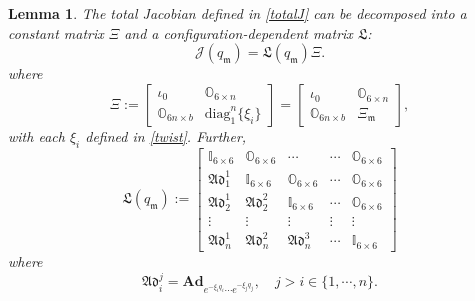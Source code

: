 \documentclass[lettersize,journal]{IEEEtran}
\def \Ad {\textbf{Ad}}
\def \Add {\mathfrak{Ad}}
\def \diag {\text{diag}}
\newtheorem{lemma}{Lemma}
\theoremstyle{remark}
\begin{document}
\begin{lemma}
The total Jacobian defined in \eqref{totalJ} can be decomposed into a constant matrix $\Xi$ and a configuration-dependent matrix $\mathfrak{L}$:
\begin{equation}
    \mathcal{J}(q_\mathfrak{m})=\mathfrak{L}(q_\mathfrak{m})\Xi.
\end{equation}
where 
\begin{equation}
\Xi:=\begin{bmatrix}\iota_0 &\mathbb{O}_{6\times n}\\\mathbb{O}_{6n\times b}& \diag_1^n\{\xi_i\}\end{bmatrix}=\begin{bmatrix}\iota_0&\mathbb{O}_{6\times n}\\\mathbb{O}_{6n\times b}&\Xi_\mathfrak{m}\end{bmatrix},
\end{equation}
with each $\xi_i$ defined in \eqref{twist}. Further, 
\begin{equation}
\mathfrak{L}(q_\mathfrak{m}):=\begin{bmatrix}\mathbb{I}_{6\times6}& \mathbb{O}_{6\times 6} & \cdots&\cdots&\mathbb{O}_{6\times 6}\\ \Add_1^1&\mathbb{I}_{6\times6}&\mathbb{O}_{6\times 6}&\cdots&\mathbb{O}_{6\times 6}\\ \Add^1_2 & \Add^2_2 &\mathbb{I}_{6\times6}&\cdots&\mathbb{O}_{6\times6}\\ \vdots &\vdots & \vdots &\vdots & \vdots\\ \Add^1_n& \Add^2_n &\Add^3_n&\cdots&\mathbb{I}_{6\times6}\end{bmatrix}
\label{LofJ}
\end{equation}
where
\begin{equation}
    \Add^j_i=\Ad_{e^{-\xi_{i}q_{i}}\cdots e^{-\xi_jq_j}}, \quad j>i \in \{1, \cdots , n\}.
\end{equation}
\end{lemma}
\end{document}
